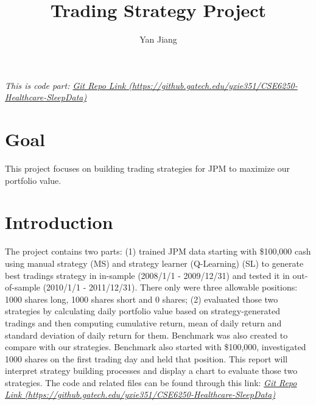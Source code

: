 \documentclass{amia}
\begin{document}
\title{Trading Strategy Project}

\author{Yan Jiang}

\institutes{
}

\maketitle

\textit{This is code part: \href{https://github.gatech.edu/yxie351/CSE6250-Healthcare-SleepData}{Git Repo Link (https://github.gatech.edu/yxie351/CSE6250-Healthcare-SleepData)}}

\section*{Goal}
This project focuses on building trading strategies for JPM to maximize our portfolio value. 

\section*{Introduction}
The project contains two parts: (1) trained JPM data starting with \$100,000 cash using manual strategy (MS) and strategy learner (Q-Learning) (SL) to generate best tradings strategy in in-sample (2008/1/1 - 2009/12/31) and tested it in out-of-sample (2010/1/1 - 2011/12/31). There only were three allowable positions: 1000 shares long, 1000 shares short and 0 shares; (2) evaluated those two strategies by calculating daily portfolio value based on strategy-generated tradings and then computing cumulative return, mean of daily return and standard deviation of daily return for them. Benchmark was also created to compare with our strategies. Benchmark also started with \$100,000, investigated 1000 shares on the first trading day and held that position. This report will interpret strategy building processes and display a chart to evaluate those two strategies. The code and related files can be found through this link: \textit{\href{https://github.gatech.edu/yxie351/CSE6250-Healthcare-SleepData}{Git Repo Link (https://github.gatech.edu/yxie351/CSE6250-Healthcare-SleepData)}}
\end{document}
